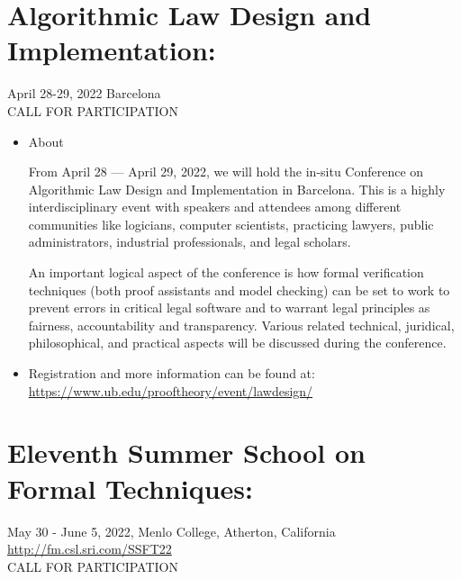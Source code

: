 \documentclass[prodmode,acmtecs]{acmsmall} %
\begin{document}
\begin{itemize}
\end{itemize}\section{Algorithmic Law Design and Implementation: }\label{AlgorithmicLawDesignandImplementation}  April 28-29, 2022 Barcelona\\ 
CALL FOR PARTICIPATION 

\begin{itemize}\item  About 
 
  From April 28 — April 29, 2022, we will hold the in-situ Conference on Algorithmic Law Design and Implementation in Barcelona.  This is a highly interdisciplinary event with speakers and attendees among different communities like logicians, computer scientists, practicing lawyers, public administrators, industrial professionals, and legal scholars. 
 
  An important logical aspect of the conference is how formal verification techniques (both proof assistants and model checking) can be set to work to prevent errors in critical legal software and to warrant legal principles as fairness, accountability and transparency. Various related technical, juridical, philosophical, and practical aspects will be discussed during the conference.  
 
\item  Registration and more information can be found at: \href{https://www.ub.edu/prooftheory/event/lawdesign/}{https://www.ub.edu/prooftheory/event/lawdesign/} 
 
\end{itemize}\section{Eleventh Summer School on Formal Techniques:}\label{EleventhSummerSchoolonFormalTechniques}  May 30 - June 5, 2022, Menlo College, Atherton, California\\ 
  \href{http://fm.csl.sri.com/SSFT22}{http://fm.csl.sri.com/SSFT22}\\ 
CALL FOR PARTICIPATION 
\end{document}
